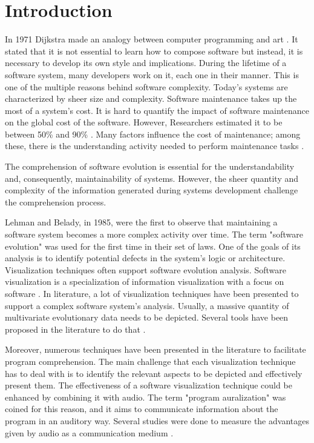 \chapter{Introduction}

In 1971 Dijkstra made an analogy between computer programming and art \cite{Dijkstra1971a}.
It stated that it is not essential to learn how to compose software but instead, it is necessary to develop its own style and implications. 
During the lifetime of a software system, many developers work on it, each one in their manner. This is one of the multiple reasons behind software complexity. 
Today's systems are characterized by sheer size and complexity. Software maintenance takes up the most of a system's cost. 
It is hard to quantify the impact of software maintenance on the global cost of the software. 
However, Researchers estimated it to be between 50\% and 90\% \cite{Davis1995} \cite{Sommerville1995}\cite{Erlikh2000} \cite{seacord2003}.
Many factors influence the cost of maintenance; among these, there is the understanding activity needed to perform maintenance tasks \cite{Corbi1989}. 

The comprehension of software evolution is essential for the understandability and, consequently, maintainability of systems.
However, the sheer quantity and complexity of the information generated during systems development challenge the comprehension process.

Lehman and Belady, in 1985, were the first to observe that maintaining a software system becomes a more complex activity over time. \cite{Lehman1985}
The term "software evolution" was used for the first time in their set of laws. 
One of the goals of its analysis is to identify potential defects in the system's logic or architecture. 
Visualization techniques often support software evolution analysis.
\bigbreak
Software visualization is a specialization of information visualization with a focus on software \cite{Lanza2003}. In literature, a lot of visualization techniques have been presented to support 
a complex software system's analysis.
Usually, a massive quantity of multivariate evolutionary data needs to be depicted. Several tools have been proposed in the literature to do that \cite{Merino2018a}.

Moreover, numerous techniques have been presented in the literature to facilitate program comprehension. 
The main challenge that each visualization technique has to deal with is to identify the relevant aspects to be depicted and effectively present them. 
The effectiveness of a software visualization technique could be enhanced by combining it with audio. 
The term "program auralization" was coined for this reason, and it aims to communicate information about the program in an auditory way.
Several studies were done to measure the advantages given by audio as a communication medium \cite{Alty1995}. 


